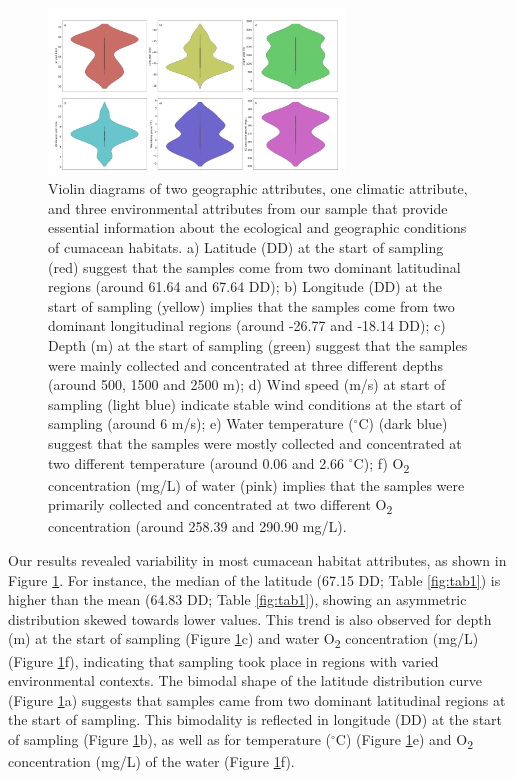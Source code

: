 \begin{figure}[htbp]
    \centering
    \includegraphics[width=0.7\textwidth]{figure1.jpg}
    \caption{Violin diagrams of two geographic attributes, one climatic attribute, and three environmental attributes from our sample that provide essential information about the ecological and geographic conditions of cumacean habitats. a) Latitude (DD) at the start of sampling (red) suggest that the samples come from two dominant latitudinal regions (around 61.64 and 67.64 DD); b) Longitude (DD) at the start of sampling (yellow) implies that the samples come from two dominant longitudinal regions (around -26.77 and -18.14 DD); c) Depth (m) at the start of sampling (green) suggest that the samples were mainly collected and concentrated at three different depths (around 500, 1500 and 2500 m); d) Wind speed (m/s) at start of sampling (light blue) indicate stable wind conditions at the start of sampling (around 6 m/s); e) Water temperature ($^\circ$C) (dark blue) suggest that the samples were mostly collected and concentrated at two different temperature (around 0.06 and 2.66 $^\circ$C); f) O\textsubscript{2} concentration (mg/L) of water (pink) implies that the samples were primarily collected and concentrated at two different O\textsubscript{2} concentration (around 258.39 and 290.90 mg/L). \label{fig:fig2}}
\end{figure}

Our results revealed variability in most cumacean habitat attributes, as shown in Figure \ref{fig:fig2}. For instance, the median of the latitude (67.15 DD; Table \ref{fig:tab1}) is higher than the mean (64.83 DD; Table \ref{fig:tab1}), showing an asymmetric distribution skewed towards lower values. This trend is also observed for depth (m) at the start of sampling (Figure \ref{fig:fig2}c) and water O\textsubscript{2} concentration (mg/L) (Figure \ref{fig:fig2}f), indicating that sampling took place in regions with varied environmental contexts. The bimodal shape of the latitude distribution curve (Figure \ref{fig:fig2}a) suggests that samples came from two dominant latitudinal regions at the start of sampling. This bimodality is reflected in longitude (DD) at the start of sampling (Figure \ref{fig:fig2}b), as well as for temperature ($^\circ$C) (Figure \ref{fig:fig2}e) and O\textsubscript{2} concentration (mg/L) of the water (Figure \ref{fig:fig2}f).

